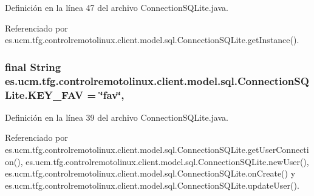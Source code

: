 Definición en la línea 47 del archivo Connection\-S\-Q\-Lite.\-java.



Referenciado por es.\-ucm.\-tfg.\-controlremotolinux.\-client.\-model.\-sql.\-Connection\-S\-Q\-Lite.\-get\-Instance().

\hypertarget{classes_1_1ucm_1_1tfg_1_1controlremotolinux_1_1client_1_1model_1_1sql_1_1ConnectionSQLite_a1110e1443cb78c4dbaaa4debe9006dcd}{
\subsubsection[{K\-E\-Y\-\_\-\-F\-A\-V}]{\setlength{\rightskip}{0pt plus 5cm}final String es.\-ucm.\-tfg.\-controlremotolinux.\-client.\-model.\-sql.\-Connection\-S\-Q\-Lite.\-K\-E\-Y\-\_\-\-F\-A\-V = \char`\"{}fav\char`\"{}\hspace{0.3cm}{\ttfamily [static]}, {\ttfamily [private]}}}\label{classes_1_1ucm_1_1tfg_1_1controlremotolinux_1_1client_1_1model_1_1sql_1_1ConnectionSQLite_a1110e1443cb78c4dbaaa4debe9006dcd}


Definición en la línea 39 del archivo Connection\-S\-Q\-Lite.\-java.



Referenciado por es.\-ucm.\-tfg.\-controlremotolinux.\-client.\-model.\-sql.\-Connection\-S\-Q\-Lite.\-get\-User\-Connection(), es.\-ucm.\-tfg.\-controlremotolinux.\-client.\-model.\-sql.\-Connection\-S\-Q\-Lite.\-new\-User(), es.\-ucm.\-tfg.\-controlremotolinux.\-client.\-model.\-sql.\-Connection\-S\-Q\-Lite.\-on\-Create() y es.\-ucm.\-tfg.\-controlremotolinux.\-client.\-model.\-sql.\-Connection\-S\-Q\-Lite.\-update\-User().


